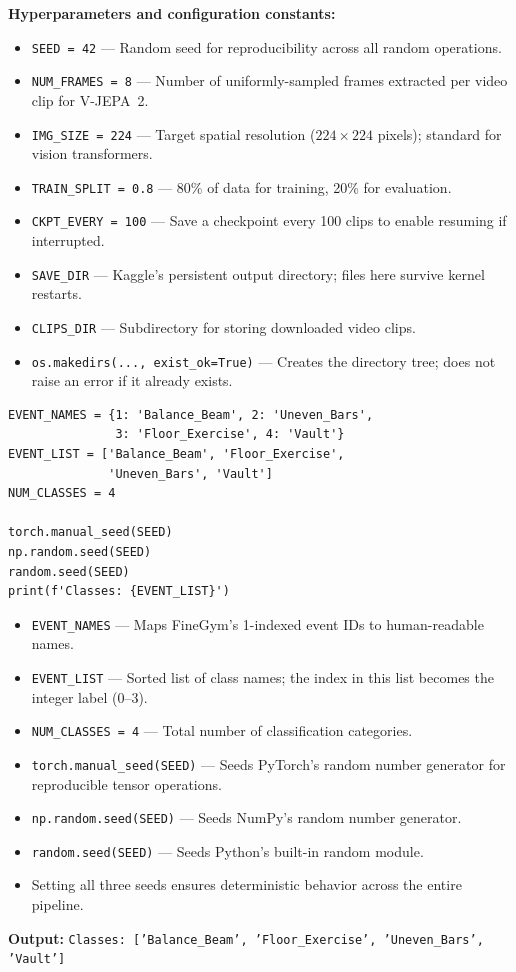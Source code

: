 \begin{explanation}
\textbf{Hyperparameters and configuration constants:}
\begin{itemize}[nosep]
  \item \texttt{SEED = 42} --- Random seed for reproducibility across all random operations.
  \item \texttt{NUM\_FRAMES = 8} --- Number of uniformly-sampled frames extracted per video clip for V-JEPA~2.
  \item \texttt{IMG\_SIZE = 224} --- Target spatial resolution ($224 \times 224$ pixels); standard for vision transformers.
  \item \texttt{TRAIN\_SPLIT = 0.8} --- 80\% of data for training, 20\% for evaluation.
  \item \texttt{CKPT\_EVERY = 100} --- Save a checkpoint every 100 clips to enable resuming if interrupted.
  \item \texttt{SAVE\_DIR} --- Kaggle's persistent output directory; files here survive kernel restarts.
  \item \texttt{CLIPS\_DIR} --- Subdirectory for storing downloaded video clips.
  \item \texttt{os.makedirs(..., exist\_ok=True)} --- Creates the directory tree; does not raise an error if it already exists.
\end{itemize}
\end{explanation}

\begin{lstlisting}
EVENT_NAMES = {1: 'Balance_Beam', 2: 'Uneven_Bars',
               3: 'Floor_Exercise', 4: 'Vault'}
EVENT_LIST = ['Balance_Beam', 'Floor_Exercise',
              'Uneven_Bars', 'Vault']
NUM_CLASSES = 4

torch.manual_seed(SEED)
np.random.seed(SEED)
random.seed(SEED)
print(f'Classes: {EVENT_LIST}')
\end{lstlisting}

\begin{explanation}
\begin{itemize}[nosep]
  \item \texttt{EVENT\_NAMES} --- Maps FineGym's 1-indexed event IDs to human-readable names.
  \item \texttt{EVENT\_LIST} --- Sorted list of class names; the index in this list becomes the integer label (0--3).
  \item \texttt{NUM\_CLASSES = 4} --- Total number of classification categories.
  \item \texttt{torch.manual\_seed(SEED)} --- Seeds PyTorch's random number generator for reproducible tensor operations.
  \item \texttt{np.random.seed(SEED)} --- Seeds NumPy's random number generator.
  \item \texttt{random.seed(SEED)} --- Seeds Python's built-in random module.
  \item Setting all three seeds ensures deterministic behavior across the entire pipeline.
\end{itemize}
\textbf{Output:} \texttt{Classes: ['Balance\_Beam', 'Floor\_Exercise', 'Uneven\_Bars', 'Vault']}
\end{explanation}

